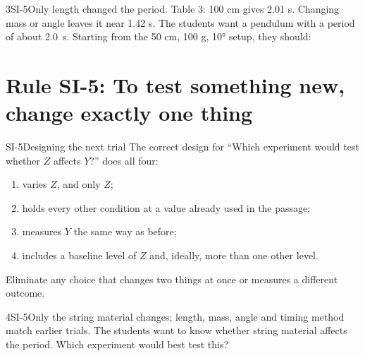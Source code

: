 \documentclass[11pt]{article}
\begin{document}
\begin{q}{3}{SI-5}{Only length changed the period. Table 3: 100 cm gives 2.01 s. Changing mass or angle leaves it near 1.42 s.}
The students want a pendulum with a period of about \SI{2.0}{\second}. Starting from the 50 cm, 100 g, \ang{10} setup, they should:
\end{q}

\section{Rule SI-5: To test something new, change exactly one thing}

\begin{rulebox}{SI-5}{Designing the next trial}
The correct design for ``Which experiment would test whether $Z$ affects $Y$?'' does all four:
\begin{enumerate}
\item varies \textbf{$Z$}, and only $Z$;
\item holds every other condition at a value already used in the passage;
\item measures \textbf{$Y$} the same way as before;
\item includes a baseline level of $Z$ and, ideally, more than one other level.
\end{enumerate}
Eliminate any choice that changes two things at once or measures a different outcome.
\end{rulebox}


\begin{q}{4}{SI-5}{Only the string material changes; length, mass, angle and timing method match earlier trials.}
The students want to know whether string material affects the period. Which experiment would best test this?
\end{q}
\end{document}
